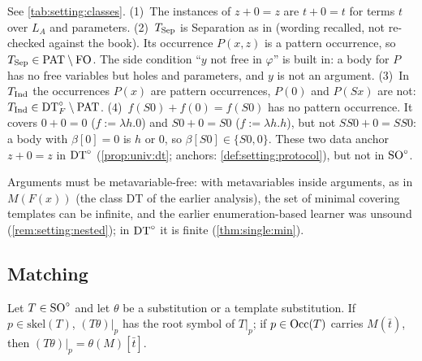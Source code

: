 \begin{example}\label{ex:setting:classes}
See \cref{tab:setting:classes}. (1)~The instances of $z+0=z$ are $t+0=t$ for terms $t$ over $L_A$ and parameters. (2)~$T_{\mathrm{Sep}}$ is Separation as in \citet{kunen1980set} (wording recalled, not re-checked against the book). Its occurrence $P(x,z)$ is a pattern occurrence, so $T_{\mathrm{Sep}}\in\mathrm{PAT}\setminus\mathrm{FO}$. The side condition ``$y$ not free in $\varphi$'' is built in: a body for $P$ has no free variables but holes and parameters, and $y$ is not an argument. (3)~In $T_{\mathrm{Ind}}$ the occurrences $P(x)$ are pattern occurrences, $P(0)$ and $P(Sx)$ are not: $T_{\mathrm{Ind}}\in\mathrm{DT}^{\circ}_{F}\setminus\mathrm{PAT}$. (4)~$f(S0)+f(0)=f(S0)$ has no pattern occurrence. It covers $0+0=0$ ($f:=\lambda h.0$) and $S0+0=S0$ ($f:=\lambda h.h$), but not $SS0+0=SS0$: a body with $\beta[0]=0$ is $h$ or $0$, so $\beta[S0]\in\{S0,0\}$. These two data anchor $z+0=z$ in $\mathrm{DT}^{\circ}$ (\cref{prop:univ:dt}; anchors: \cref{def:setting:protocol}), but not in $\mathrm{SO}^{\circ}$.
\end{example}

Arguments must be metavariable-free: with metavariables inside arguments, as in $M(F(x))$ (the class $\mathrm{DT}$ of the earlier analysis), the set of minimal covering templates can be infinite, and the earlier enumeration-based learner was unsound (\cref{rem:setting:nested}); in $\mathrm{DT}^{\circ}$ it is finite (\cref{thm:single:min}).

\subsection{Matching}\label{sec:setting:matching}

\begin{lemma}[Preservation]\label{lem:setting:preservation}
Let $T\in\mathrm{SO}^{\circ}$ and let $\theta$ be a substitution or a template substitution. If $p\in\mathrm{skel}(T)$, $(T\theta)|_p$ has the root symbol of $T|_p$; if $p\in\mathrm{Occ}(T)$ carries $M(\bar t)$, then $(T\theta)|_p=\theta(M)[\bar t]$.
\end{lemma}

